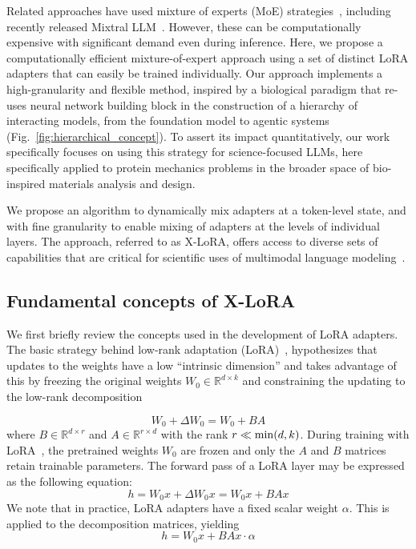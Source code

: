 Related approaches have used mixture of experts (MoE) strategies~\cite{Jacobs1991AdaptiveExperts,Hampshire1992TheRecognition,Jordan1994HierarchicalAlgorithm}, including recently released Mixtral LLM~\cite{Jiang2024MixtralExperts}. However, these can be computationally expensive with significant demand even during inference. Here, we propose a computationally efficient mixture-of-expert approach using a set of distinct LoRA adapters that can easily be trained individually. Our approach implements a high-granularity and flexible method, inspired by a biological paradigm that re-uses neural network building block in the construction of a hierarchy of interacting models, from the foundation model to agentic systems (Fig.~\ref{fig:hierarchical_concept}). To assert its impact quantitatively, our work specifically focuses on using this strategy for science-focused LLMs, here specifically applied to protein mechanics problems in the broader space of bio-inspired materials analysis and design.



We propose an algorithm to dynamically mix adapters at a token-level state, and with fine granularity to enable mixing of adapters at the levels of individual layers. The approach, referred to as X-LoRA, offers access to diverse sets of capabilities that are critical for scientific uses of multimodal language modeling~\cite{Hu2023DeepScience,Buehler2023AMetamaterials,Buehler2022ProteinNetworks,}. 


\subsection{Fundamental concepts of X-LoRA}

We first briefly review the concepts used in the development of LoRA adapters. The basic strategy behind low-rank adaptation (LoRA)~\cite{hu2021lora}, hypothesizes that updates to the weights have a low “intrinsic dimension” and takes advantage of this by freezing the original weights $W_0 \in \mathbb{R}^{d \times k}$ and constraining the updating to the low-rank decomposition 
 
\begin{equation}
W_0 + \Delta W_0 = W_0 + BA 
\end{equation}
where $B \in \mathbb{R}^{d \times r}$  and $A \in \mathbb{R}^{r \times d}$ with the rank $r \ll {\rm min}(d,k)$. During training with LoRA~\cite{hu2021lora}, the pretrained weights $W_0$ are frozen and only the $A$ and $B$ matrices retain trainable parameters. The forward pass of a LoRA layer may be expressed as the following equation:
\begin{equation}
    h = W_0x + \Delta W_0x = W_0x + BAx
\end{equation}
We note that in practice, LoRA adapters have a fixed scalar weight $\alpha$. This is applied to the decomposition matrices, yielding
\begin{equation}
    h = W_0x + BAx \cdot \alpha
\end{equation}


